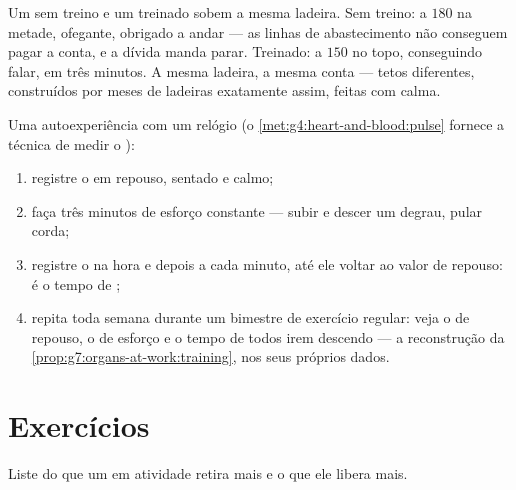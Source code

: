 \begin{example}\label{ex:g7:organs-at-work:runners}
Um sem treino e um treinado sobem a mesma ladeira. Sem treino:  a
$180$ na metade, ofegante, obrigado a andar --- as linhas de
abastecimento não conseguem pagar a conta, e a dívida manda parar.
Treinado:  a $150$ no topo, conseguindo falar,  em
três minutos. A mesma ladeira, a mesma conta --- tetos diferentes,
construídos por meses de ladeiras exatamente assim, feitas com calma.
\end{example}

\begin{method}\label{met:g7:organs-at-work:read}
Uma autoexperiência com um relógio (o
\cref{met:g4:heart-and-blood:pulse} fornece a técnica de medir o
):
\begin{enumerate}
  \item registre o  em repouso, sentado e calmo;
  \item faça três minutos de esforço constante --- subir e descer um
        degrau, pular corda;
  \item registre o  na hora e depois a cada minuto, até ele
        voltar ao valor de repouso: é o tempo de ;
  \item repita toda semana durante um bimestre de exercício regular:
        veja o  de repouso, o  de esforço e o tempo de
         todos irem descendo --- a reconstrução da
        \cref{prop:g7:organs-at-work:training}, nos seus próprios
        dados.
\end{enumerate}
\end{method}

\section{Exercícios}

\begin{exercise}[$\star$]\label{exo:g7:organs-at-work:1}
Liste do que um  em atividade retira mais e o que ele libera
mais.
\end{exercise}

